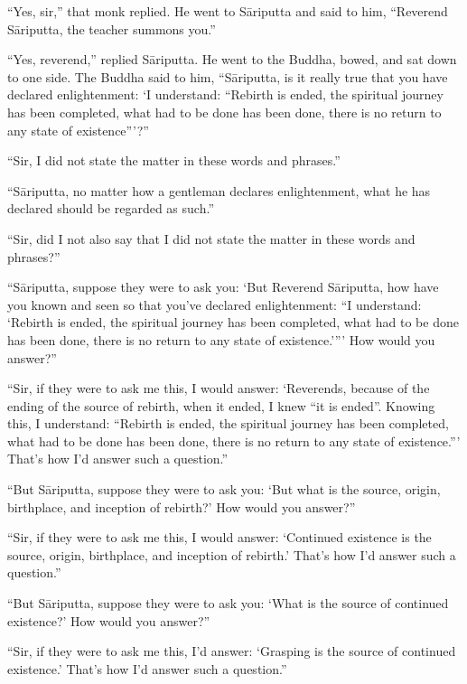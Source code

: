 \documentclass[12pt,openany]{book}%
\begin{document}
“Yes, sir,” that monk replied. He went to \textsanskrit{Sāriputta} and said to him, “Reverend \textsanskrit{Sāriputta}, the teacher summons you.” 

“Yes, reverend,” replied \textsanskrit{Sāriputta}. He went to the Buddha, bowed, and sat down to one side. The Buddha said to him, “\textsanskrit{Sāriputta}, is it really true that you have declared enlightenment: ‘I understand: “Rebirth is ended, the spiritual journey has been completed, what had to be done has been done, there is no return to any state of existence”’?” 

“Sir, I did not state the matter in these words and phrases.” 

“\textsanskrit{Sāriputta}, no matter how a gentleman declares enlightenment, what he has declared should be regarded as such.” 

“Sir, did I not also say that I did not state the matter in these words and phrases?” 

“\textsanskrit{Sāriputta}, suppose they were to ask you: ‘But Reverend \textsanskrit{Sāriputta}, how have you known and seen so that you’ve declared enlightenment: “I understand: ‘Rebirth is ended, the spiritual journey has been completed, what had to be done has been done, there is no return to any state of existence.’”’ How would you answer?” 

“Sir, if they were to ask me this, I would answer: ‘Reverends, because of the ending of the source of rebirth, when it ended, I knew “it is ended”. Knowing this, I understand: “Rebirth is ended, the spiritual journey has been completed, what had to be done has been done, there is no return to any state of existence.”’ That’s how I’d answer such a question.” 

“But \textsanskrit{Sāriputta}, suppose they were to ask you: ‘But what is the source, origin, birthplace, and inception of rebirth?’ How would you answer?” 

“Sir, if they were to ask me this, I would answer: ‘Continued existence is the source, origin, birthplace, and inception of rebirth.’ That’s how I’d answer such a question.” 

“But \textsanskrit{Sāriputta}, suppose they were to ask you: ‘What is the source of continued existence?’ How would you answer?” 

“Sir, if they were to ask me this, I’d answer: ‘Grasping is the source of continued existence.’ That’s how I’d answer such a question.” 
\end{document}
